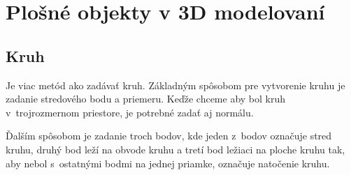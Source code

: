 





\section{Plošné objekty v 3D modelovaní}


\subsection*{Kruh}
Je viac metód ako zadávať kruh. Základným spôsobom pre vytvorenie kruhu je zadanie stredového bodu a priemeru. Keďže chceme aby bol kruh v~trojrozmernom priestore, je potrebné zadať aj normálu. 

Ďalším spôsobom je zadanie troch bodov, kde jeden z~bodov označuje stred kruhu, druhý bod leží na obvode kruhu a tretí bod ležiaci na ploche kruhu tak, aby nebol s~ostatnými bodmi na jednej priamke, označuje natočenie kruhu.

